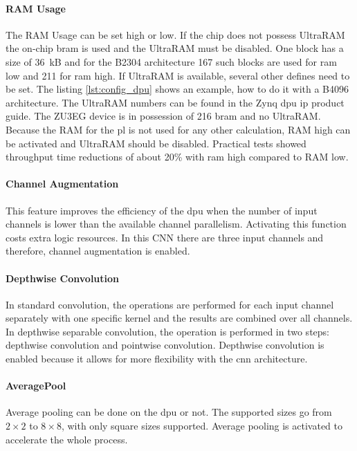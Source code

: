\paragraph{RAM Usage}
The RAM Usage can be set high or low.
If the chip does not possess UltraRAM the on-chip \acrshort{bram} is used and the UltraRAM must be disabled.
One block has a size of \SI{36}{kB} and for the B2304 architecture 167 such blocks are used for \acrshort{ram} low and 211 for \acrshort{ram} high.
If UltraRAM is available, several other defines need to be set.
The listing \ref{lst:config_dpu} shows an example, how to do it with a B4096 architecture.
The UltraRAM numbers can be found in the Zynq \acrshort{dpu} \acrshort{ip} product guide.
The ZU3EG device is in possession of 216 \acrfull{bram} and no UltraRAM.
Because the RAM for the \acrshort{pl} is not used for any other calculation, RAM high can be activated and UltraRAM should be disabled.
Practical tests showed throughput time reductions of about 20\% with \acrshort{ram} high compared to RAM low.

\paragraph{Channel Augmentation}
This feature improves the efficiency of the \acrshort{dpu} when the number of input channels is lower than the available channel parallelism.
Activating this function costs extra logic resources.
In this CNN there are three input channels and therefore, channel augmentation is enabled.

\paragraph{Depthwise Convolution}
In standard convolution, the operations are performed for each input channel separately with one specific kernel and the results are combined over all channels.
In depthwise separable convolution, the operation is performed in two steps: depthwise convolution and pointwise convolution.
Depthwise convolution is enabled because it allows for more flexibility with the \acrshort{cnn} architecture.

\paragraph{AveragePool}
Average pooling can be done on the \acrshort{dpu} or not.
The supported sizes go from $2\times2$ to $8\times8$, with only square sizes supported.
Average pooling is activated to accelerate the whole process.


